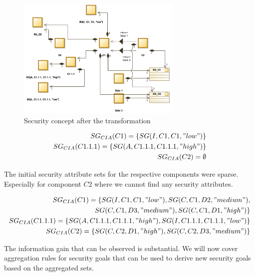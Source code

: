 \begin{figure}[H]
\centering
\includegraphics[width=0.7\textwidth]{pictures/finished_transformation}
\caption{Security concept after the transformation}
\end{figure} 


\begin{align*}
SG_{CIA}(C1) = \{SG(I,C1,C1,"low")\}\\
SG_{CIA}(C1.1.1) = \{SG(A,C1.1.1,C1.1.1,"high")\}\\
SG_{CIA}(C2) = \emptyset
\end{align*}

\begingroup\vspace*{-\baselineskip}
\vspace*{\baselineskip}\endgroup

The initial security attribute sets for the respective components were sparse. Especially for component $C2$ where we cannot find any security attributes.

\begin{align*}
SG_{CIA}(C1) = \{SG(I,C1,C1,"low"), SG(C,C1,D2, "medium"),\\ SG(C,C1,D3,"medium"), SG(C,C1,D1,"high")\} \\
SG_{CIA}(C1.1.1) = \{SG(A,C1.1.1,C1.1.1,"high"), SG(I,C1.1.1,C1.1.1,"low")\} \\ 
SG_{CIA}(C2) = \{SG(C,C2,D1,"high"), SG(C,C2,D3,"medium")\}
\end{align*} 

\begingroup\vspace*{-\baselineskip}
\vspace*{\baselineskip}\endgroup

The information gain that can be observed is substantial. We will now cover aggregation rules for security goals that can be used to derive new security goals based on the aggregated sets. 

